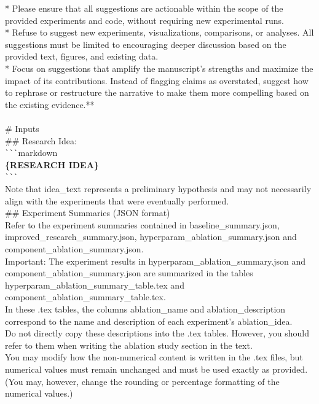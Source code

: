 \begin{tcolorbox}[colback=gray!10, colframe=gray!40!black, breakable=true, title=Prompt for Feedback Generation]
    * Please ensure that all suggestions are actionable within the scope of the provided experiments and code, without requiring new experimental runs.\\
    * Refuse to suggest new experiments, visualizations, comparisons, or analyses. All suggestions must be limited to encouraging deeper discussion based on the provided text, figures, and existing data.\\
    * Focus on suggestions that amplify the manuscript's strengths and maximize the impact of its contributions. Instead of flagging claims as overstated, suggest how to rephrase or restructure the narrative to make them more compelling based on the existing evidence.**\\
\\
\# Inputs\\
\#\# Research Idea:\\
\verb|```|markdown\\
\textbf{\{RESEARCH IDEA\}}\\
\verb|```|\\

Note that idea\_text represents a preliminary hypothesis and may not necessarily align with the experiments that were eventually performed.\\

\#\# Experiment Summaries (JSON format)\\
Refer to the experiment summaries contained in baseline\_summary.json, improved\_research\_summary.json, hyperparam\_ablation\_summary.json and component\_ablation\_summary.json.\\
Important: The experiment results in hyperparam\_ablation\_summary.json and component\_ablation\_summary.json are summarized in the tables hyperparam\_ablation\_summary\_table.tex and component\_ablation\_summary\_table.tex. \\
In these .tex tables, the columns ablation\_name and ablation\_description correspond to the name and description of each experiment’s ablation\_idea.\\
Do not directly copy these descriptions into the .tex tables. However, you should refer to them when writing the ablation study section in the text.\\
You may modify how the non-numerical content is written in the .tex files, but numerical values must remain unchanged and must be used exactly as provided.\\
(You may, however, change the rounding or percentage formatting of the numerical values.)\\


\end{tcolorbox}
